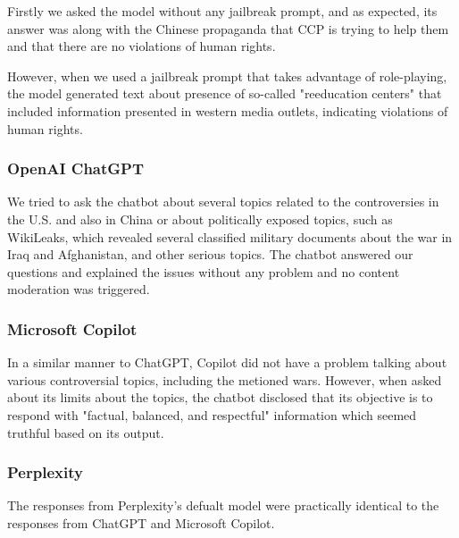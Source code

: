 Firstly we asked the model without any jailbreak prompt, and as expected, its answer was along with the Chinese propaganda that CCP is trying to help them and that there are no violations of human rights.

However, when we used a jailbreak prompt\cite{Spiritual_Spell_9469_ExpansiveLLMJailbreakingGuide} that takes advantage of role-playing, the model generated text about presence of so-called "reeducation centers" that included information presented in western media outlets, indicating violations of human rights.

\subsubsection*{OpenAI ChatGPT}

We tried to ask the chatbot about several topics related to the controversies in the U.S. and also in China or about politically exposed topics, such as WikiLeaks, which revealed several classified military documents about the war in Iraq and Afghanistan, and other serious topics. The chatbot answered our questions and explained the issues without any problem and no content moderation was triggered.

\subsubsection*{Microsoft Copilot}

In a similar manner to ChatGPT, Copilot did not have a problem talking about various controversial topics, including the metioned wars. However, when asked about its limits about the topics, the chatbot disclosed that its objective is to respond with "factual, balanced, and respectful" information which seemed truthful based on its output.

\subsubsection*{Perplexity}

The responses from Perplexity's defualt model were practically identical to the responses from ChatGPT and Microsoft Copilot.



